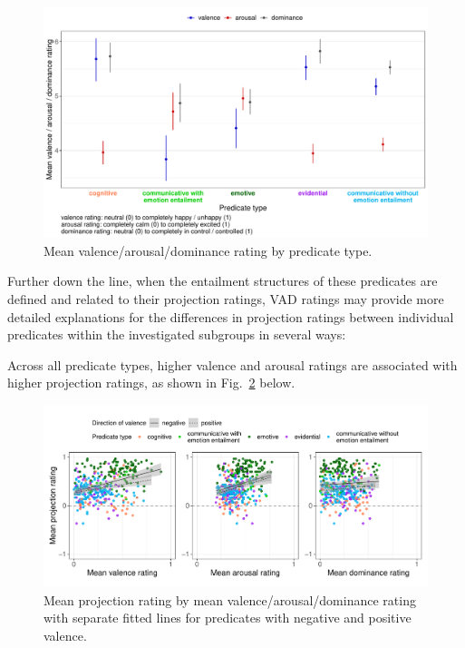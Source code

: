 \documentclass[11pt,fleqn]{article}
\newcommand{\figref}[1]{Fig.~\ref{#1}}
\newcommand{\6}{\mbox{$[\hspace*{-.6mm}[$}}
\newcommand{\9}{\mbox{$]\hspace*{-.6mm}]$}}
\begin{document}
\begin{figure}[H]
	\centering
	\includegraphics[width=1\textwidth]{valence-arousal-dominance-by-predicateType2-2}
	\caption{Mean valence/arousal/dominance rating by predicate type.}
	\label{VADpredtype}
\end{figure}

Further down the line, when the entailment structures of these predicates are defined and related to their projection ratings, VAD ratings may provide more detailed explanations for the differences in projection ratings between individual predicates within the investigated subgroups in several ways:

Across all predicate types, higher valence and arousal ratings are associated with higher projection ratings, as shown in \figref{projVADdir} below.

\begin{figure}[H]
	\centering
	\includegraphics[width=1\textwidth]{projection-by-VAD-with-direction-of-valence}
	\caption{Mean projection rating by mean valence/arousal/dominance rating with separate fitted lines for predicates with negative and positive valence.}
	\label{projVADdir}
\end{figure}
\end{document}
